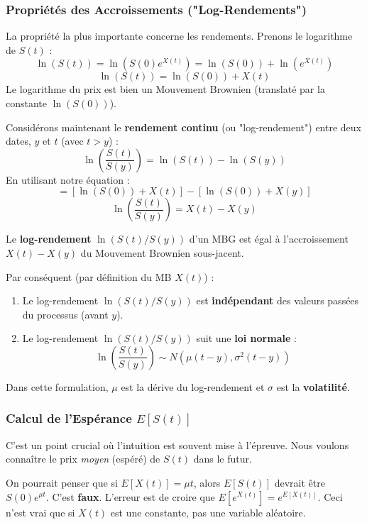 \subsubsection{Propriétés des Accroissements ("Log-Rendements")}

La propriété la plus importante concerne les rendements. Prenons le logarithme de $S(t)$ :
$$ \ln(S(t)) = \ln(S(0) e^{X(t)}) = \ln(S(0)) + \ln(e^{X(t)}) $$
$$ \ln(S(t)) = \ln(S(0)) + X(t) $$
Le logarithme du prix est bien un Mouvement Brownien (translaté par la constante $\ln(S(0))$).

Considérons maintenant le \textbf{rendement continu} (ou "log-rendement") entre deux dates, $y$ et $t$ (avec $t > y$) :
$$ \ln\left(\frac{S(t)}{S(y)}\right) = \ln(S(t)) - \ln(S(y)) $$
En utilisant notre équation :
$$ = \left[ \ln(S(0)) + X(t) \right] - \left[ \ln(S(0)) + X(y) \right] $$
$$ \ln\left(\frac{S(t)}{S(y)}\right) = X(t) - X(y) $$

\begin{theorembox}
Le \textbf{log-rendement} $\ln(S(t)/S(y))$ d'un MBG est égal à l'accroissement $X(t) - X(y)$ du Mouvement Brownien sous-jacent.

Par conséquent (par définition du MB $X(t)$) :
\begin{enumerate}
    \item Le log-rendement $\ln(S(t)/S(y))$ est \textbf{indépendant} des valeurs passées du processus (avant $y$).
    \item Le log-rendement $\ln(S(t)/S(y))$ suit une \textbf{loi normale} :
    $$ \ln\left(\frac{S(t)}{S(y)}\right) \sim N\left(\mu(t-y), \sigma^2(t-y)\right) $$
\end{enumerate}
Dans cette formulation, $\mu$ est la dérive du log-rendement et $\sigma$ est la \textbf{volatilité}.
\end{theorembox}

\subsubsection{Calcul de l'Espérance $E[S(t)]$}

C'est un point crucial où l'intuition est souvent mise à l'épreuve. Nous voulons connaître le prix \textit{moyen} (espéré) de $S(t)$ dans le futur.

On pourrait penser que si $E[X(t)] = \mu t$, alors $E[S(t)]$ devrait être $S(0)e^{\mu t}$. C'est \textbf{faux}.
L'erreur est de croire que $E[e^{X(t)}] = e^{E[X(t)]}$. Ceci n'est vrai que si $X(t)$ est une constante, pas une variable aléatoire.

